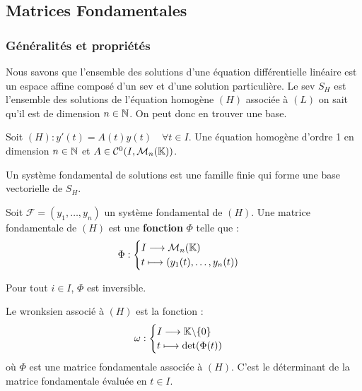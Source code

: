 \subsection{Matrices Fondamentales}

\subsubsection{Généralités et propriétés} 

Nous savons que l'ensemble des solutions d'une équation différentielle linéaire est un 
espace affine composé d'un sev et d'une solution particulière. 
Le sev $S_H$ est l'ensemble des solutions de l'équation homogène $(H)$ associée à $(L)$ 
on sait qu'il est de dimension $n \in \mathbb{N}$. On peut donc en trouver une base. 

\vspace{0.3cm}

Soit $(H) : y'(t) = A(t) y(t) \quad \forall t \in I$. Une équation homogène d'ordre 1
en dimension $n \in  \mathbb{N}$ et $A \in \mathcal{C}^0(I, \mathcal{M}_n(\mathbb{K}))$.   

\begin{definition}
	Un système fondamental de solutions est une famille finie qui forme une base 
	vectorielle de $S_H$. 
\end{definition} 

\begin{definition}
	Soit $ \mathcal{F} = (y_1, \dots, y_n)$ un système fondamental de $(H)$. 
	Une matrice fondamentale de $(H)$ est une \textbf{fonction} $\Phi$ telle que : 
		\[ \Phi : 
			\begin{cases}
				I \longrightarrow \mathcal{M}_n(\mathbb{K}) \\ 
				t \longmapsto (y_1(t), \dots, y_n(t))
			\end{cases}  \]	
\end{definition} 

\begin{remark}
	Pour tout $ i \in  I$, $\Phi$ est inversible. 
\end{remark} 

\begin{definition}[Wronksien]
	Le wronksien associé à $(H)$ est la fonction : 
		\[ \omega : 
			\begin{cases}
				I \longrightarrow \mathbb{K} \backslash \{0\} \\ 
				t \longmapsto \det (\Phi(t))
			\end{cases} \]
	où $\Phi$ est une matrice fondamentale associée à $(H)$.
	C'est le déterminant de la matrice fondamentale évaluée en $t \in  I$. 
\end{definition} 

